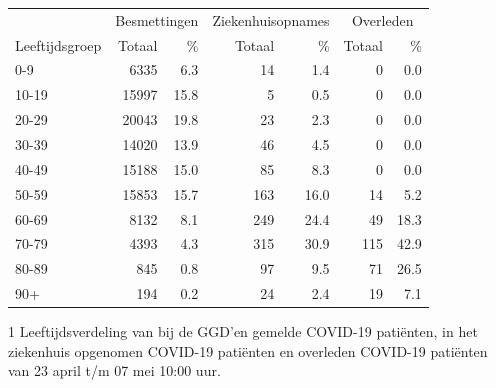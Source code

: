 \documentclass[
  english,
  man,floatsintext]{apa6}
\begin{document}
\begin{table}
\centering\begingroup\fontsize{11}{13}\selectfont

\begin{threeparttable}
\begin{tabular}{lrrrrrr}
\toprule
\multicolumn{1}{c}{ } & \multicolumn{2}{c}{Besmettingen} & \multicolumn{2}{c}{Ziekenhuisopnames} & \multicolumn{2}{c}{Overleden} \\
\cmidrule(l{3pt}r{3pt}){2-3} \cmidrule(l{3pt}r{3pt}){4-5} \cmidrule(l{3pt}r{3pt}){6-7}
Leeftijdsgroep & Totaal & \% & Totaal & \% & Totaal & \%\\
\midrule
0-9 & 6335 & 6.3 & 14 & 1.4 & 0 & 0.0\\
10-19 & 15997 & 15.8 & 5 & 0.5 & 0 & 0.0\\
20-29 & 20043 & 19.8 & 23 & 2.3 & 0 & 0.0\\
30-39 & 14020 & 13.9 & 46 & 4.5 & 0 & 0.0\\
40-49 & 15188 & 15.0 & 85 & 8.3 & 0 & 0.0\\
50-59 & 15853 & 15.7 & 163 & 16.0 & 14 & 5.2\\
60-69 & 8132 & 8.1 & 249 & 24.4 & 49 & 18.3\\
70-79 & 4393 & 4.3 & 315 & 30.9 & 115 & 42.9\\
80-89 & 845 & 0.8 & 97 & 9.5 & 71 & 26.5\\
90+ & 194 & 0.2 & 24 & 2.4 & 19 & 7.1\\
\bottomrule
\end{tabular}
\begin{tablenotes}
\item[1] Leeftijdsverdeling van bij de GGD’en gemelde COVID-19 patiënten, in het ziekenhuis opgenomen COVID-19 patiënten en overleden COVID-19 patiënten van 23 april t/m 07 mei 10:00 uur.
\end{tablenotes}
\end{threeparttable}
\endgroup{}
\end{table}

\newpage
\end{document}
